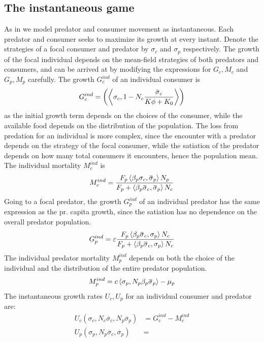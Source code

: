 \subsection{The instantaneous game}
As in  we model predator and consumer movement as instantaneous. Each predator and consumer seeks to maximize its growth at every instant. Denote the strategies of a focal consumer and predator by $\sigma_c$ and $\sigma_p$ respectively.  The growth of the focal individual depends on the mean-field strategies of both predators and consumers, and can be arrived at by modifying the expressions for $G_c,M_c$ and $G_p, M_p$ carefully.
The growth $G_c^{ind}$ of an individual consumer is
\begin{equation}
  G_c^{ind} = \pa{\ip{\sigma_c}{1-N_c \frac{\overbar{\sigma}_c}{K\phi + K_0}}}
\end{equation}
as the initial growth term depends on the choices of the consumer, while the available food depends on the distribution of the population. The loss from predation for an individual is more complex, since the encounter with a predator depends on the strategy of the focal consumer, while the satiation of the predator depends on how many total consumers it encounters, hence the population mean. The individual mortality $M_c^{ind}$ is
\begin{equation}
  M_c^{ind} =  \frac{F_p \ip{\beta_p \sigma_c}{\overbar{\sigma}_p} N_p}{F_p + \ip{\beta_p \overbar{\sigma}_c}{\overbar{\sigma}_p} N_c}
\end{equation}
Going to a focal predator, the growth $G_p^{ind}$ of an individual predator has the same expression as the pr. capita growth, since the satiation has no dependence on the overall predator population.
\begin{equation}
  G_p^{ind} = \epsilon \frac{F_p \ip{\beta_p \overbar{\sigma}_c}{\sigma_p} N_c}{F_p + \ip{\beta_p \overbar{\sigma}_c}{\sigma_p} N_c}
\end{equation}
The individual predator mortality $M_p^{ind}$ depends on both the choice of the individual and the distribution of the entire predator population.
\begin{equation}
  M_p^{ind} =  c \ip{\sigma_p}{N_p\beta_p \overbar{\sigma}_p}  - \mu_p
\end{equation}
The instantaneous growth rates $U_c,U_p$ for an individual consumer and predator are:
\begin{align}
  U_c(\sigma_c, N_c \overbar{\sigma}_c, N_p\overbar{\sigma}_p) &=  G_c^{ind} - M_c^{ind} \\
  U_p(\sigma_p, N_p \overbar{\sigma}_c, \overbar{\sigma}_p) &=
\end{align}
